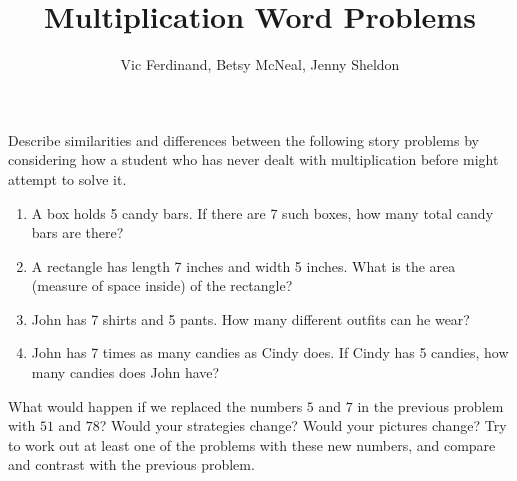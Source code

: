 \documentclass{ximera}
\title{Multiplication Word Problems}
\author{Vic Ferdinand, Betsy McNeal, Jenny Sheldon}
\begin{document}
\begin{abstract} \end{abstract}
\maketitle


\begin{problem}
Describe similarities and differences between the following story problems by considering how a student who has never dealt with multiplication before might attempt to solve it.
\begin{enumerate}
\item A box holds 5 candy bars.  If there are 7 such boxes, how many total candy bars are there?

\vfill

\item A rectangle has length 7 inches and width 5 inches.  What is the area (measure of space inside) of the rectangle?


\vfill


\item John has 7 shirts and 5 pants.  How many different outfits can he wear?


\vfill

\item John has 7 times as many candies as Cindy does.  If Cindy has 5 candies, how many candies does John have?

\vfill

\end{enumerate}
\end{problem}

\begin{problem}
What would happen if we replaced the numbers $5$ and $7$ in the previous problem with $51$ and $78$?  Would your strategies change?  Would your pictures change?  Try to work out at least one of the problems with these new numbers, and compare and contrast with the previous problem.
\end{problem}
\end{document}

